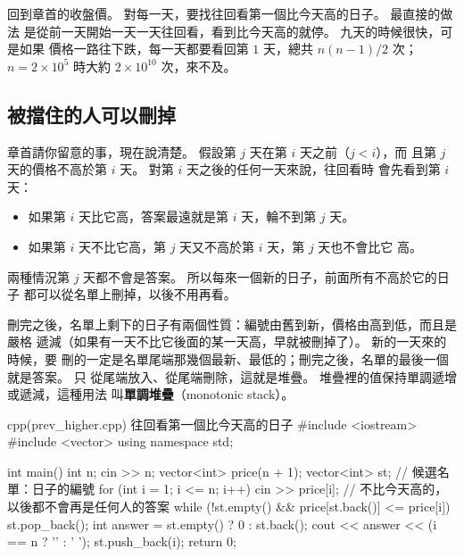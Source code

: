 回到章首的收盤價。 對每一天，要找往回看第一個比今天高的日子。 最直接的做法
是從前一天開始一天一天往回看，看到比今天高的就停。 九天的時候很快，可是如果
價格一路往下跌，每一天都要看回第 $1$ 天，總共 $n(n-1)/2$ 次；$n = 2 \times
10^5$ 時大約 $2 \times 10^{10}$ 次，來不及。

\subsection{被擋住的人可以刪掉}

章首請你留意的事，現在說清楚。 假設第 $j$ 天在第 $i$ 天之前（$j < i$），而
且第 $j$ 天的價格不高於第 $i$ 天。 對第 $i$ 天之後的任何一天來說，往回看時
會先看到第 $i$ 天：
\begin{itemize}
\item 如果第 $i$ 天比它高，答案最遠就是第 $i$ 天，輪不到第 $j$ 天。
\item 如果第 $i$ 天不比它高，第 $j$ 天又不高於第 $i$ 天，第 $j$ 天也不會比它
高。
\end{itemize}
兩種情況第 $j$ 天都不會是答案。 所以每來一個新的日子，前面所有不高於它的日子
都可以從名單上刪掉，以後不用再看。

刪完之後，名單上剩下的日子有兩個性質：編號由舊到新，價格由高到低，而且是嚴格
遞減（如果有一天不比它後面的某一天高，早就被刪掉了）。 新的一天來的時候，要
刪的一定是名單尾端那幾個最新、最低的；刪完之後，名單的最後一個就是答案。 只
從尾端放入、從尾端刪除，這就是堆疊。 堆疊裡的值保持單調遞增或遞減，這種用法
叫\textbf{單調堆疊}（monotonic stack）。

\begin{example}[label=ex:prev-higher]{cpp}{(prev\_higher.cpp) 往回看第一個比今天高的日子}
#include <iostream>
#include <vector>
using namespace std;

int main() {
    int n;
    cin >> n;
    vector<int> price(n + 1);
    vector<int> st;                       // 候選名單：日子的編號
    for (int i = 1; i <= n; i++) {
        cin >> price[i];
        // 不比今天高的，以後都不會再是任何人的答案
        while (!st.empty() && price[st.back()] <= price[i]) {
            st.pop_back();
        }
        int answer = st.empty() ? 0 : st.back();
        cout << answer << (i == n ? '\n' : ' ');
        st.push_back(i);
    }
    return 0;
}
\end{example}


